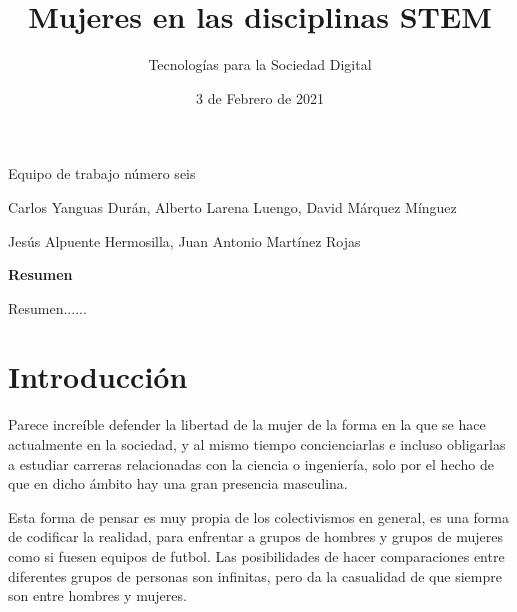  

 

\graphicspath{{../Book/figures/}}

\title{Mujeres en las disciplinas STEM}
\date{3 de Febrero de 2021}            
\author{Tecnologías para la Sociedad Digital}




\maketitle
\begin{description}                               
  {        
  \item[Título en inglés:] \mybooktitleenglish   
  }                                            
  {                                           
  }                                              
\item[Equipo:] Equipo de trabajo número seis 
\item[Autores:] Carlos Yanguas Durán, Alberto Larena Luengo, David Márquez Mínguez                 
\item[\expandafter\makefirstuc\expandafter{\mybookTutorOrTutores}:] Jesús Alpuente Hermosilla, Juan Antonio Martínez Rojas      
\end{description}      
\setcounter{page}{1}


\begin{center}
 {\bfseries \Large Resumen}
\end{center}

Resumen......                      

\section{Introducción}
\label{sec:introduccion}

Parece increíble defender la libertad de la mujer de la forma en la que se hace actualmente en la sociedad, 
y al mismo tiempo concienciarlas e incluso obligarlas a estudiar carreras relacionadas con la ciencia o ingeniería,
solo por el hecho de que en dicho ámbito hay una gran presencia masculina. 

Esta forma de pensar es muy propia de los colectivismos en general, es una forma de codificar la realidad, para 
enfrentar a grupos de hombres y grupos de mujeres como si fuesen equipos de futbol. Las posibilidades de hacer 
comparaciones entre diferentes grupos de personas son infinitas, pero da la casualidad de que siempre son entre 
hombres y mujeres. 

